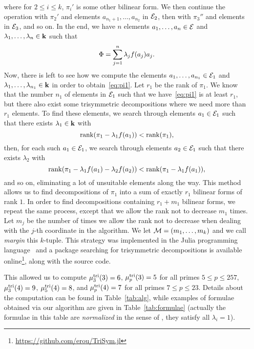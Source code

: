 \documentclass[11pt]{article}
\begin{document}
where for $2\leq i \leq k$, $\pi_i'$ is some other bilinear form.
We then continue the operation with $\pi_2'$ and elements $a_{n_1+1}, \dots,
a_{n_2}$ in $\mathcal{E}_2$, then with $\pi_3''$ and elements in $\mathcal{E}_3$, and so on. In
the end, we have $n$ elements $a_1, \dots, a_n\in \mathcal{E}$ and $\lambda_1, \dots,
\lambda_n\in\mathbf{k}$ such that
\[
  \Phi = \sum_{j=1}^{n}\lambda_jf(a_j)a_j.
\]
Now, there is left to see how we compute the elements $a_1, \dots,
a_{n_1}\in\mathcal{E}_1$ and $\lambda_1, \dots, \lambda_{n_1}\in\mathbf{k}$ in order to
obtain~\eqref{eq:pi1}. Let $r_1$ be the rank of $\pi_1$. We know that the number
$n_1$ of elements in $\mathcal{E}_1$ such that we have~\eqref{eq:pi1} is at least $r_1$,
but there also exist some trisymmetric decompositions where we need more than $r_1$
elements. To find these elements, we search through elements $a_1\in\mathcal{E}_1$ such that
there exists $\lambda_1\in\mathbf{k}$ with
\[
  \operatorname{rank}(\pi_1-\lambda_1f(a_1))<\operatorname{rank}(\pi_1),
\]
then, for each such $a_1\in\mathcal{E}_1$, we search through elements $a_2\in\mathcal{E}_1$ such that there exists $\lambda_2$
with
\[
  \operatorname{rank}(\pi_1-\lambda_1f(a_1)-\lambda_2f(a_2))<\operatorname{rank}(\pi_1-\lambda_1f(a_1)),
\]
and so on, eliminating a lot of unsuitable elements along the way. This method
allows us to find decompositions of $\pi_1$ into a sum of exactly $r_1$ bilinear forms of
rank $1$. In order to find decompositions containing $r_1+m_1$ bilinear forms, we
repeat the same process, except that we allow the rank not to decrease $m_1$
times. Let $m_j$ be the number of times we allow the rank not to decrease
when dealing with the $j$-th coordinate in the algorithm. We let $\mathcal{M}=(m_1,
\dots, m_k)$ and we call \emph{margin} this $k$-tuple. This strategy was
implemented in the Julia programming
language~\cite{Julia} and a package searching for trisymmetric decompositions is
available online\footnote{\url{https://github.com/erou/TriSym.jl}}, along with
the source code.

This allowed us to compute $\mu^{\textrm{tri}}_3(3)=6$,
$\mu^{\textrm{tri}}_p(3)=5$ for all primes $5\leq p\leq 257$,
$\mu^{\textrm{tri}}_3(4)=9$, $\mu^{\textrm{tri}}_5(4)=8$, and $\mu^{\textrm{tri}}_p(4)=7$ for all primes $7\leq p\leq 23$. Details about the computation can be found in Table~\ref{tab:alg},
while examples of formulae obtained via our algorithm are given in Table~\ref{tab:formulae}
(actually the formulae in this table are \emph{normalized} in the sense of \cite[Def.~A.16]{Randriam15},
\ie they satisfy all $\lambda_i=1$).
\end{document}
